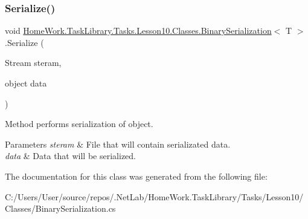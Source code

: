 \subsubsection{\texorpdfstring{Serialize()}{Serialize()}}
{\footnotesize\ttfamily void \mbox{\hyperlink{class_home_work_1_1_task_library_1_1_tasks_1_1_lesson10_1_1_classes_1_1_binary_serialization}{Home\+Work.\+Task\+Library.\+Tasks.\+Lesson10.\+Classes.\+Binary\+Serialization}}$<$ T $>$.Serialize (\begin{DoxyParamCaption}\item[{Stream}]{steram,  }\item[{object}]{data }\end{DoxyParamCaption})}



Method performs serialization of object. 


\begin{DoxyParams}{Parameters}
{\em steram} & File that will contain serializated data.\\
\hline
{\em data} & Data that will be serialized.\\
\hline
\end{DoxyParams}


The documentation for this class was generated from the following file\+:\begin{DoxyCompactItemize}
\item 
C\+:/\+Users/\+User/source/repos/.\+Net\+Lab/\+Home\+Work.\+Task\+Library/\+Tasks/\+Lesson10/\+Classes/Binary\+Serialization.\+cs\end{DoxyCompactItemize}
